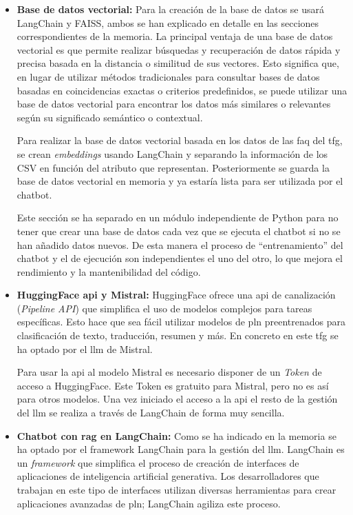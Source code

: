 \begin{itemize}
    \item \textbf{Base de datos vectorial:} Para la creación de la base de datos se usará LangChain y FAISS, ambos se han explicado en detalle en las secciones correspondientes de la memoria. La principal ventaja de una base de datos vectorial es que permite realizar búsquedas y recuperación de datos rápida y precisa basada en la distancia o similitud de sus vectores. Esto significa que, en lugar de utilizar métodos tradicionales para consultar bases de datos basadas en coincidencias exactas o criterios predefinidos, se puede utilizar una base de datos vectorial para encontrar los datos más similares o relevantes según su significado semántico o contextual.

    Para realizar la base de datos vectorial basada en los datos de las \acrshort{faq} del \acrlong{tfg}, se crean \textit{embeddings} usando LangChain y separando la información de los CSV en función del atributo que representan. Posteriormente se guarda la base de datos vectorial en memoria y ya estaría lista para ser utilizada por el chatbot.

    Este sección se ha separado en un módulo independiente de Python para no tener que crear una base de datos cada vez que se ejecuta el chatbot si no se han añadido datos nuevos. De esta manera el proceso de ``entrenamiento'' del chatbot y el de ejecución son independientes el uno del otro, lo que mejora el rendimiento y la mantenibilidad del código.

    \item \textbf{HuggingFace \acrshort{api} y Mistral:} HuggingFace ofrece una \acrshort{api} de canalización (\textit{Pipeline API}) que simplifica el uso de modelos complejos para tareas específicas. Esto hace que sea fácil utilizar modelos de \acrshort{pln} preentrenados para clasificación de texto, traducción, resumen y más. En concreto en este \acrshort{tfg} se ha optado por el \acrshort{llm} de Mistral.

    Para usar la \acrshort{api} al modelo Mistral es necesario disponer de un \textit{Token} de acceso a HuggingFace. Este Token es gratuito para Mistral, pero no es así para otros modelos. Una vez iniciado el acceso a la \acrshort{api} el resto de la gestión del \acrshort{llm} se realiza a través de LangChain de forma muy sencilla.

    \item \textbf{Chatbot con \acrshort{rag} en LangChain:} Como se ha indicado en la memoria se ha optado por el framework LangChain para la gestión del \acrshort{llm}. LangChain es un \textit{framework} que simplifica el proceso de creación de interfaces de aplicaciones de inteligencia artificial generativa. Los desarrolladores que trabajan en este tipo de interfaces utilizan diversas herramientas para crear aplicaciones avanzadas de \acrshort{pln}; LangChain agiliza este proceso.


\end{itemize}
